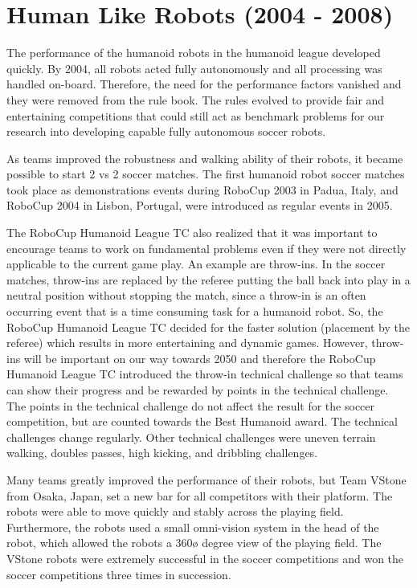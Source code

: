 \documentclass{llncs}
\begin{document}
\section{Human Like Robots (2004 - 2008)}
\label{sec:two}

The performance of the humanoid robots in the humanoid league
developed quickly. By 2004, all robots acted fully autonomously and
all processing was handled on-board. Therefore, the need for the
performance factors vanished and they were removed from the rule
book. The rules evolved to provide fair and entertaining competitions
that could still act as benchmark problems for our research into
developing capable fully autonomous soccer robots.

As teams improved the robustness and walking ability of their robots,
it became possible to start 2 vs 2 soccer matches. The first humanoid
robot soccer matches took place as demonstrations events during
RoboCup 2003 in Padua, Italy, and RoboCup 2004 in Lisbon, Portugal, were
introduced as regular events in 2005.

The RoboCup Humanoid League TC also realized that it was important to
encourage teams to work on fundamental problems even if they were not
directly applicable to the current game play. An example are
throw-ins. In the soccer matches, throw-ins are replaced by the
referee putting the ball back into play in a neutral position without
stopping the match, since a throw-in is an often occurring event that
is a time consuming task for a humanoid robot. So, the RoboCup
Humanoid League TC decided for the faster solution (placement by the
referee) which results in more entertaining and dynamic
games. However, throw-ins will be important on our way towards 2050
and therefore the RoboCup Humanoid League TC introduced the throw-in
technical challenge so that teams can show their progress and be
rewarded by points in the technical challenge. The points in the
technical challenge do not affect the result for the soccer
competition, but are counted towards the Best Humanoid award. The
technical challenges change regularly. Other technical challenges were
uneven terrain walking, doubles passes, high kicking, and dribbling
challenges.

Many teams greatly improved the performance of their robots, but Team
VStone from Osaka, Japan, set a new bar for all competitors with their
platform. The robots were able to move quickly and stably across the
playing field. Furthermore, the robots used a small omni-vision system
in the head of the robot, which allowed the robots a 360\o{ } degree
view of the playing field. The VStone robots were extremely successful
in the soccer competitions and won the soccer competitions three times
in succession.
\end{document}
